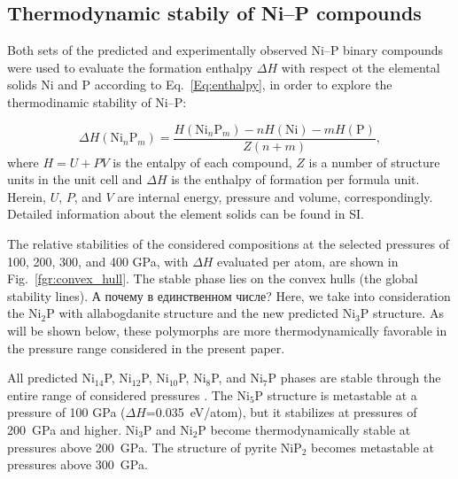 \documentclass[twoside,twocolumn,9pt]{article}
\begin{document}
\subsection{Thermodynamic stabily of Ni--P compounds}
Both sets of the predicted and experimentally observed Ni--P binary compounds were used to evaluate the formation enthalpy $\Delta H$ with respect ot the elemental solids Ni and P according to Eq.~\ref{Eq:enthalpy}, in order to explore the thermodinamic stability of Ni--P:  

\begin{equation}\label{Eq:enthalpy}
 \Delta H(\mathrm{Ni}_n\mathrm{P}_m) = \frac{H(\mathrm{Ni}_n\mathrm{P}_m)-nH(\mathrm{Ni})-mH(\mathrm{P})}{Z(n+m)},
\end{equation} 
where $H=U+PV$ is the entalpy of each compound, $Z$ is a number of structure units in the unit cell and $\Delta H$ is the enthalpy of formation per formula unit. 
Herein, $U$, $P$, and $V$ are internal energy, pressure and volume, correspondingly. 
Detailed information about the element solids can be found in SI. 

The relative stabilities of the considered compositions at the selected pressures of 100, 200, 300, and 400 GPa, with $\Delta H$ evaluated per atom, are shown in Fig.~\ref{fgr:convex_hull}. 
The stable phase lies on the convex hulls (the global stability lines). А почему в единственном числе?
Here, we take into consideration the Ni$_2$P with allabogdanite structure and the new predicted Ni$_3$P structure. 
As will be shown below, these polymorphs are more thermodynamically favorable in the pressure range considered in the present paper.

All predicted Ni$_{14}$P, Ni$_{12}$P, Ni$_{10}$P, Ni$_8$P, and Ni$_7$P phases are stable through the entire range of considered pressures . 
The Ni$_{5}$P structure is metastable at a pressure of 100 GPa ($\Delta H$=0.035~eV/atom), but it stabilizes at pressures of 200~GPa and higher. 
Ni$_3$P and Ni$_2$P become thermodynamically stable at pressures above 200~GPa. 
The structure of pyrite NiP$_2$ becomes metastable at pressures above 300~GPa.
\end{document}

